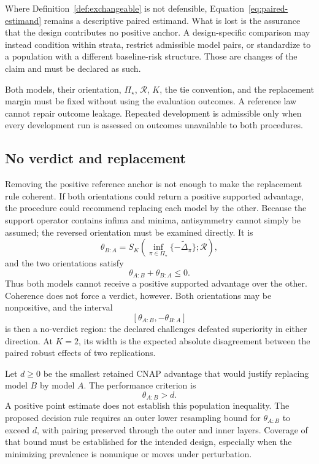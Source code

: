 \documentclass[11pt]{article}
\newcommand{\Regime}{\mathcal{R}}
\newcommand{\PSet}{\Pi_\star}
\newcommand{\Dta}{\widetilde{\Delta}}
\theoremstyle{remark}
\begin{document}
Where Definition~\ref{def:exchangeable} is not defensible, Equation~\eqref{eq:paired-estimand} remains a descriptive paired estimand. What is lost is the assurance that the design contributes no positive anchor. A design-specific comparison may instead condition within strata, restrict admissible model pairs, or standardize to a population with a different baseline-risk structure. Those are changes of the claim and must be declared as such.

Both models, their orientation, $\PSet$, $\Regime$, $K$, the tie convention, and the replacement margin must be fixed without using the evaluation outcomes. A reference law cannot repair outcome leakage. Repeated development is admissible only when every development run is assessed on outcomes unavailable to both procedures.

\subsection{No verdict and replacement}

Removing the positive reference anchor is not enough to make the replacement rule coherent. If both orientations could return a positive supported advantage, the procedure could recommend replacing each model by the other. Because the support operator contains infima and minima, antisymmetry cannot simply be assumed; the reversed orientation must be examined directly. It is
\[
\theta_{B:A}
=
S_K\left(
\inf_{\pi\in\PSet}\{-\Dta_\pi\};
\Regime
\right),
\]
and the two orientations satisfy
\begin{equation}
\theta_{A:B}+\theta_{B:A}\leq0.
\label{eq:orientation}
\end{equation}
Thus both models cannot receive a positive supported advantage over the other. Coherence does not force a verdict, however. Both orientations may be nonpositive, and the interval
\[
\left[\theta_{A:B},-\theta_{B:A}\right]
\]
is then a no-verdict region: the declared challenges defeated superiority in either direction. At $K=2$, its width is the expected absolute disagreement between the paired robust effects of two replications.

Let $d\geq0$ be the smallest retained CNAP advantage that would justify replacing model $B$ by model $A$. The performance criterion is
\begin{equation}
\theta_{A:B}>d.
\label{eq:replacement}
\end{equation}
A positive point estimate does not establish this population inequality. The proposed decision rule requires an outer lower resampling bound for $\theta_{A:B}$ to exceed $d$, with pairing preserved through the outer and inner layers. Coverage of that bound must be established for the intended design, especially when the minimizing prevalence is nonunique or moves under perturbation.
\end{document}
